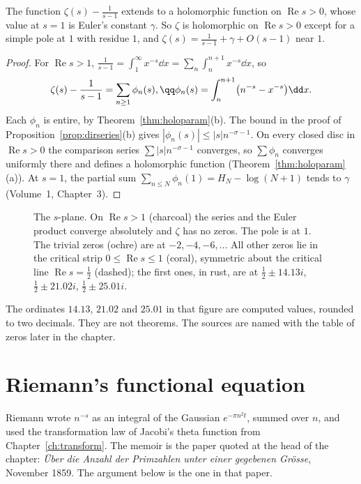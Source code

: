 \begin{proposition}\label{prop:zetastrip}
The function $\zeta(s)-\frac1{s-1}$ extends to a holomorphic function on $\operatorname{Re}s>0$, whose value at $s=1$ is Euler's constant $\gamma$. So $\zeta$ is
holomorphic on $\operatorname{Re}s>0$ except for a simple pole at $1$ with residue $1$, and $\zeta(s)=\frac1{s-1}+\gamma+O(s-1)$ near $1$.
\end{proposition}
\begin{proof}
For $\operatorname{Re}s>1$, $\frac1{s-1}=\int_1^\infty x^{-s}\dd x=\sum_n\int_n^{n+1}x^{-s}\dd x$, so
\[
\begin{gathered}\zeta(s)-\frac1{s-1}=\sum_{n\ge1}\phi_n(s),\qq\phi_n(s)=\int_n^{n+1}\bigl(n^{-s}-x^{-s}\bigr)\dd x.\end{gathered}
\]
Each $\phi_n$ is entire, by Theorem~\ref{thm:holoparam}(b). The bound in the proof of Proposition~\ref{prop:dirseries}(b) gives $|\phi_n(s)|\le|s|n^{-\sigma-1}$. On every closed disc in $\operatorname{Re}s>0$ the comparison series $\sum|s|n^{-\sigma-1}$ converges, so $\sum\phi_n$ converges uniformly there and defines a holomorphic function (Theorem~\ref{thm:holoparam}(a)). At $s=1$, the partial sum $\sum_{n\le N}\phi_n(1)=H_N-\log(N+1)$ tends to $\gamma$ (Volume~1, Chapter~3).
\end{proof}

\begin{figure}[ht]
\centering
{}
\caption{The $s$-plane. On $\operatorname{Re}s>1$ (charcoal) the series and the Euler product converge absolutely and $\zeta$ has no zeros. The pole is at $1$.
The trivial zeros (ochre) are at $-2,-4,-6,\dots$ All other zeros lie in the critical strip $0\le\operatorname{Re}s\le1$ (coral), symmetric about the critical
line $\operatorname{Re}s=\frac12$ (dashed); the first ones, in rust, are at $\frac12\pm14.13i$, $\frac12\pm21.02i$, $\frac12\pm25.01i$.}
\label{fig:plane}
\end{figure}

The ordinates $14.13$, $21.02$ and $25.01$ in that figure are computed values, rounded to two decimals. They are not theorems. The sources are named with the table of zeros later in the chapter.

\section{Riemann's functional equation}

Riemann wrote $n^{-s}$ as an integral of the Gaussian $e^{-\pi n^2t}$, summed over $n$, and used the transformation law of Jacobi's theta function from Chapter~\ref{ch:transform}. The memoir is the paper quoted at the head of the chapter: \emph{\"Uber die Anzahl der Primzahlen unter einer gegebenen Gr\"osse}, November 1859. The argument below is the one in that paper.

